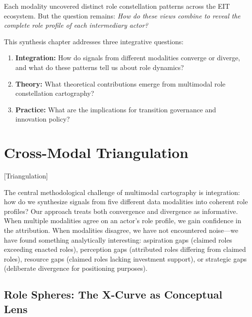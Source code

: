 \documentclass[../main.tex]{subfiles}
\begin{document}
Each modality uncovered distinct role constellation patterns across the EIT ecosystem. But the question remains: \emph{How do these views combine to reveal the complete role profile of each intermediary actor?}

This synthesis chapter addresses three integrative questions:

\begin{enumerate}
    \item \textbf{Integration:} How do signals from different modalities converge or diverge, and what do these patterns tell us about role dynamics?
    \item \textbf{Theory:} What theoretical contributions emerge from multimodal role constellation cartography?
    \item \textbf{Practice:} What are the implications for transition governance and innovation policy?
\end{enumerate}

\section{Cross-Modal Triangulation}[Triangulation]

The central methodological challenge of multimodal cartography is integration: how do we synthesize signals from five different data modalities into coherent role profiles? Our approach treats both convergence and divergence as informative. When multiple modalities agree on an actor's role profile, we gain confidence in the attribution. When modalities disagree, we have not encountered noise---we have found something analytically interesting: aspiration gaps (claimed roles exceeding enacted roles), perception gaps (attributed roles differing from claimed roles), resource gaps (claimed roles lacking investment support), or strategic gaps (deliberate divergence for positioning purposes).

\subsection{Role Spheres: The X-Curve as Conceptual Lens}
\end{document}
